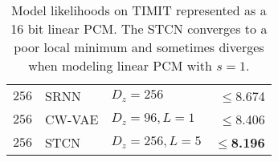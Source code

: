 {\begin{table}[t!]
\begin{tabular}{ll|lr}
        $256$      & SRNN                & $D_z=256$             & $\leq$8.674 \\
        $256$      & CW-VAE              & $D_z=96, L=1$         & $\leq$8.406 \\
        $256$      & STCN                & $D_z=256,L=5$  & $\leq$\textbf{8.196} \\
        \bottomrule
    \end{tabular}
    \vspace{2mm}
    \caption[Model likelihoods on TIMIT represented as a 16 bit linear PCM]{
    Model likelihoods on TIMIT represented as a 16 bit linear PCM. The STCN converges to a poor local minimum and sometimes diverges when modeling linear PCM with $s=1$.
    }
    \label{tab: timit likelihoods dmol linear appendix}
\end{table}


}
